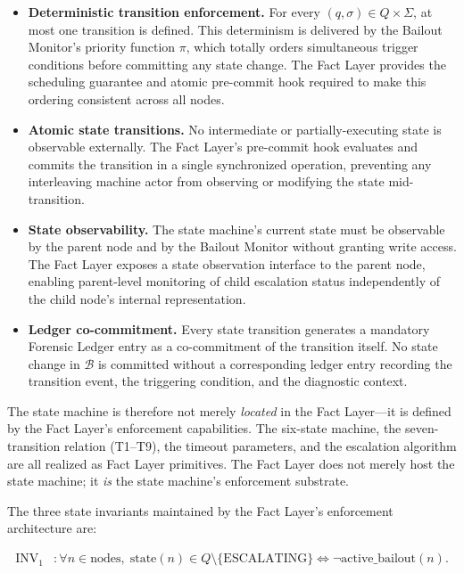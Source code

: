 \begin{itemize}\itemsep=0pt
\item[(\textit{i})] \textbf{Deterministic transition enforcement.} For every $(q, \sigma) \in Q \times \Sigma$, at most one transition is defined. This determinism is delivered by the Bailout Monitor's priority function $\pi$, which totally orders simultaneous trigger conditions before committing any state change. The Fact Layer provides the scheduling guarantee and atomic pre-commit hook required to make this ordering consistent across all nodes.

\item[(\textit{ii})] \textbf{Atomic state transitions.} No intermediate or partially-executing state is observable externally. The Fact Layer's pre-commit hook evaluates and commits the transition in a single synchronized operation, preventing any interleaving machine actor from observing or modifying the state mid-transition.

\item[(\textit{iii})] \textbf{State observability.} The state machine's current state must be observable by the parent node and by the Bailout Monitor without granting write access. The Fact Layer exposes a state observation interface to the parent node, enabling parent-level monitoring of child escalation status independently of the child node's internal representation.

\item[(\textit{iv})] \textbf{Ledger co-commitment.} Every state transition generates a mandatory Forensic Ledger entry as a co-commitment of the transition itself. No state change in $\mathcal{B}$ is committed without a corresponding ledger entry recording the transition event, the triggering condition, and the diagnostic context.
\end{itemize}

The state machine is therefore not merely \emph{located} in the Fact Layer---it is defined by the Fact Layer's enforcement capabilities. The six-state machine, the seven-transition relation (T1--T9), the timeout parameters, and the escalation algorithm are all realized as Fact Layer primitives. The Fact Layer does not merely host the state machine; it \emph{is} the state machine's enforcement substrate.

The three state invariants maintained by the Fact Layer's enforcement architecture are:

\begin{align}
\mathrm{INV}_1 &: \forall n \in \mathrm{nodes},\; \mathrm{state}(n) \in Q \setminus \{\mathrm{ESCALATING}\} \iff \neg\mathrm{active\_bailout}(n). \tag{INV-1}
\end{align}

